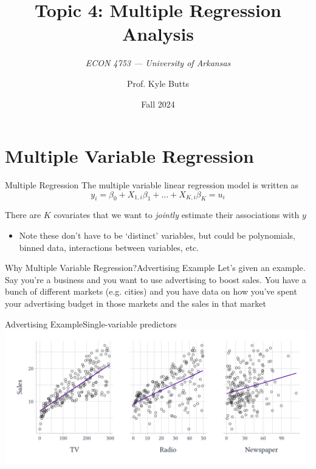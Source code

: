 \documentclass[aspectratio=169,t,11pt,table]{beamer}
\title{Topic 4: Multiple Regression Analysis}
\subtitle{\it  ECON 4753 — University of Arkansas}
\date{Fall 2024}
\author{Prof. Kyle Butts}
\begin{document}
\begin{frame}
\maketitle

\end{frame}

\section{Multiple Variable Regression}

\begin{frame}{Multiple Regression}
  The multiple variable linear regression model is written as
  $$
    y_i = \beta_0 + X_{1,i} \beta_1 + \dots + X_{K,i} \beta_K = u_i
  $$
  
  \bigskip
  There are $K$ covariates that we want to \emph{jointly} estimate their associations with $y$
  \begin{itemize}
    \item Note these don't have to be `distinct' variables, but could be polynomials, binned data, interactions between variables, etc. 
  \end{itemize} 
\end{frame}

\begin{frame}{Why Multiple Variable Regression?}{Advertising Example}
  Let's given an example. Say you're a business and you want to use advertising to boost sales. You have a bunch of different markets (e.g. cities) and you have data on how you've spent your advertising budget in those markets and the sales in that market
\end{frame}

\begin{frame}{Advertising Example}{Single-variable predictors}
  \includegraphics[width=\textwidth]{figures/sales_bivariate.pdf}
\end{frame}
\end{document}
